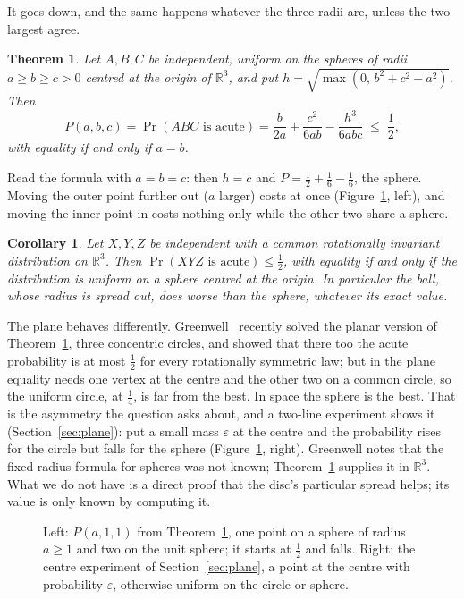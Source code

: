 \documentclass[11pt]{article}
\newtheorem{theorem}{Theorem}
\newtheorem{corollary}{Corollary}
\theoremstyle{remark}
\begin{document}
It goes down, and the same happens whatever the three radii are, unless the two largest agree.

\begin{theorem}\label{thm:main}
Let $A,B,C$ be independent, uniform on the spheres of radii $a\ge b\ge c>0$ centred at the origin of
$\mathbb R^3$, and put $h=\sqrt{\max(0,\,b^2+c^2-a^2)}$. Then
\[
P(a,b,c)=\Pr(ABC\text{ is acute})=\frac b{2a}+\frac{c^2}{6ab}-\frac{h^3}{6abc}\;\le\;\frac12 ,
\]
with equality if and only if $a=b$.
\end{theorem}

Read the formula with $a=b=c$: then $h=c$ and $P=\frac12+\frac16-\frac16$, the sphere. Moving the outer point
further out ($a$ larger) costs at once (Figure~\ref{fig:curves}, left), and moving the inner point in costs
nothing only while the other two share a sphere.

\begin{corollary}\label{cor:law}
Let $X,Y,Z$ be independent with a common rotationally invariant distribution on $\mathbb R^3$. Then
$\Pr(XYZ\text{ is acute})\le\frac12$, with equality if and only if the distribution is uniform on a sphere
centred at the origin. In particular the ball, whose radius is spread out, does worse than the sphere, whatever
its exact value.
\end{corollary}

The plane behaves differently. Greenwell~\cite{Gre26} recently solved the planar version of
Theorem~\ref{thm:main}, three concentric circles, and showed that there too the acute probability is at most
$\frac12$ for every rotationally symmetric law; but in the plane equality needs one vertex at the centre and the
other two on a common circle, so the uniform circle, at $\frac14$, is far from the best. In space the sphere is the
best. That is the asymmetry the question asks about, and a two-line experiment shows it
(Section~\ref{sec:plane}): put a small mass $\varepsilon$ at the centre and the probability rises for the circle
but falls for the sphere (Figure~\ref{fig:curves}, right). Greenwell notes that the fixed-radius formula for
spheres was not known; Theorem~\ref{thm:main} supplies it in $\mathbb R^3$. What we do not have is a direct proof
that the disc's particular spread helps; its value is only known by computing it.

\begin{figure}[ht]
\centering

\caption{Left: $P(a,1,1)$ from Theorem~\ref{thm:main}, one point on a sphere of radius $a\ge1$ and two on the unit
sphere; it starts at $\frac12$ and falls. Right: the centre experiment of Section~\ref{sec:plane}, a point at the
centre with probability $\varepsilon$, otherwise uniform on the circle or sphere.}
\label{fig:curves}
\end{figure}
\end{document}
